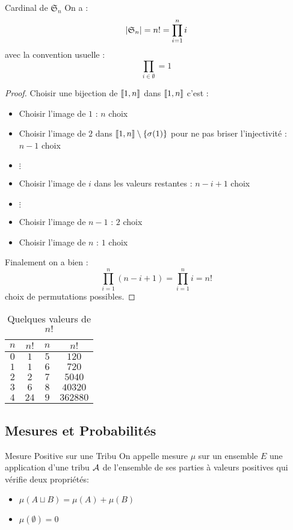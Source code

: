 \documentclass{cours}
\begin{document}
\begin{propositionfr}{Cardinal de $\mathfrak{S}_{n}$}
    On a :
    \[
        \left|\mathfrak{S}_{n}\right| = n! = \prod_{i = 1}^{n} i
    \]
    avec la convention usuelle :
    \[
        \prod_{i \in \emptyset} = 1
    \]
\end{propositionfr}
\begin{proof}
    Choisir une bijection de $\left\llbracket 1, n\right\rrbracket$ dans $\left\llbracket 1, n\right\rrbracket$ c'est :
    \begin{itemize}
        \item Choisir l'image de $1$ : $n$ choix
        \item Choisir l'image de $2$ dans $\left\llbracket 1, n\right\rrbracket\setminus \left\{\sigma(1)\right\}$ pour ne pas briser l'injectivité : $n - 1$ choix
        \item $\vdots$
        \item Choisir l'image de $i$ dans les valeurs restantes : $n - i + 1$ choix
        \item $\vdots$
        \item Choisir l'image de $n - 1$ : $2$ choix
        \item Choisir l'image de $n$ : $1$ choix
    \end{itemize}
    Finalement on a bien :
    \[
        \prod_{i = 1}^{n} (n - i + 1) = \prod_{i = 1}^{n} i = n!
    \]
    choix de permutations possibles.
\end{proof}

\begin{table}
    \begin{tabular}{cc|cc}
        \toprule
        $n$ & $n!$ & $n$ & $n!$     \\
        \midrule
        $0$ & $1$  & $5$ & $120$    \\
        $1$ & $1$  & $6$ & $720$    \\
        $2$ & $2$  & $7$ & $5040$   \\
        $3$ & $6$  & $8$ & $40320$  \\
        $4$ & $24$ & $9$ & $362880$ \\
        \bottomrule
    \end{tabular}
    \caption{Quelques valeurs de $n!$}
\end{table}

\subsection{Mesures et Probabilités}
\begin{définition}{Mesure Positive sur une Tribu}{}
On appelle mesure $\mu$ sur un ensemble $E$ une application d'une tribu $\mathcal{A}$ de l'ensemble de ses parties à valeurs positives qui vérifie deux propriétés:
\begin{itemize}
    \item $\mu(A \sqcup B) = \mu(A) + \mu(B)$
    \item $\mu(\emptyset) = 0$
\end{itemize}
\end{définition}
\end{document}
